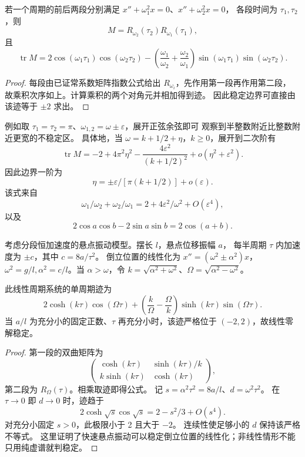 \begin{proposition}[分段常系数计算]
若一个周期的前后两段分别满足 $x''+\omega_1^2x=0$、$x''+\omega_2^2x=0$，
各段时间为 $\tau_1,\tau_2$，则
\[
 M=R_{\omega_2}(\tau_2)R_{\omega_1}(\tau_1),
\]
且
\[
 \operatorname{tr}M=2\cos(\omega_1\tau_1)\cos(\omega_2\tau_2)
 -\left(\frac{\omega_1}{\omega_2}+\frac{\omega_2}{\omega_1}\right)
 \sin(\omega_1\tau_1)\sin(\omega_2\tau_2).
\]
\end{proposition}
\begin{proof}
每段由已证常系数矩阵指数公式给出 $R_{\omega_i}$，先作用第一段再作用第二段，
故乘积次序如上。计算乘积的两个对角元并相加得到迹。
因此稳定边界可直接由该迹等于 $\pm2$ 求出。
\end{proof}
例如取 $\tau_1=\tau_2=\pi$、$\omega_{1,2}=\omega\pm\varepsilon$，展开正弦余弦即可
观察到半整数附近比整数附近更宽的不稳定区。
具体地，当 $\omega=k+1/2+\eta$，$k\geq0$，展开到二次阶有
\[
 \operatorname{tr}M=-2+4\pi^2\eta^2-
 \frac{4\varepsilon^2}{(k+1/2)^2}+o(\eta^2+\varepsilon^2).
\]
因此边界一阶为
\[
 \eta=\pm\varepsilon/[\pi(k+1/2)]+o(\varepsilon).
\]
该式来自 
\[
 \omega_1/\omega_2+\omega_2/\omega_1
=2+4\varepsilon^2/\omega^2+O(\varepsilon^4),
\]
以及
\[
 2\cos a\cos b-2\sin a\sin b=2\cos(a+b).
\]

\begin{example}[倒立摆的快速悬点振动]
考虑分段恒加速度的悬点振动模型。摆长 $l$，悬点位移振幅 $a$，
每半周期 $\tau$ 内加速度为 $\pm c$，其中 $c=8a/\tau^2$。
倒立位置的线性化为 $x''=(\omega^2\pm\alpha^2)x$，
$\omega^2=g/l,\alpha^2=c/l$。当 $\alpha>\omega$，令
$k=\sqrt{\alpha^2+\omega^2}$、$\Omega=\sqrt{\alpha^2-\omega^2}$。
\end{example}
\begin{proposition}
此线性周期系统的单周期迹为
\[
 2\cosh(k\tau)\cos(\Omega\tau)
 +\left(\frac{k}{\Omega}-\frac{\Omega}{k}\right)
 \sinh(k\tau)\sin(\Omega\tau).
\]
当 $a/l$ 为充分小的固定正数、$\tau$ 再充分小时，该迹严格位于 $(-2,2)$，故线性零解稳定。
\end{proposition}
\begin{proof}
第一段的双曲矩阵为
\[
 \begin{pmatrix}
  \cosh(k\tau)&\sinh(k\tau)/k\\
  k\sinh(k\tau)&\cosh(k\tau)
 \end{pmatrix},
\]
第二段为 $R_\Omega(\tau)$。相乘取迹即得公式。
记 $s=\alpha^2\tau^2=8a/l$、$d=\omega^2\tau^2$。
在 $\tau\to0$ 即 $d\to0$ 时，迹趋于
\[
 2\cosh\sqrt s\cos\sqrt s=2-s^2/3+O(s^4).
\]
对充分小固定 $s>0$，此极限小于 2 且大于 $-2$。
连续性使足够小的 $d$ 保持该严格不等式。
这里证明了快速悬点振动可以稳定倒立位置的线性化；非线性情形不能只用纯虚谱就判稳定。
\end{proof}

